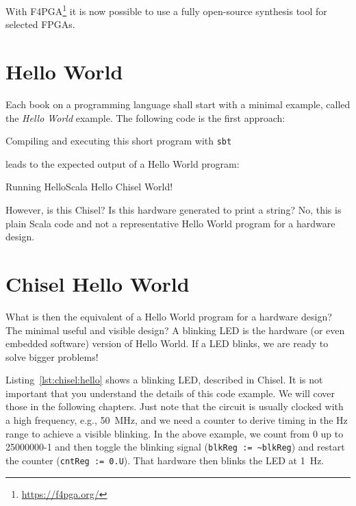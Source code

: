 \documentclass[%
    10pt,
    headinclude, footexclude,
    openright, %
    notitlepage,
    cleardoubleempty,
    headsepline,
    pointlessnumbers,
    bibtotoc, idxtotoc,
    ]{scrbook}
\newcommand{\code}[1]{{\lstinline[basicstyle=\small\ttfamily]{#1}}}
\newcommand{\myref}[2]{\href{#1}{#2}}
\renewcommand{\myref}[2]{{#2}{\footnote{\url{#1}}}}
\begin{document}
With \myref{https://f4pga.org/}{F4PGA} it is now possible to use a fully open-source synthesis tool
for selected FPGAs.

\section{Hello World}

Each book on a programming language shall start with a minimal example,
called the \emph{Hello World} example. The following code is the first approach:




\noindent Compiling and executing this short program with \code{sbt}


\noindent leads to the expected output of a Hello World program:

\begin{chisel}
[info] Running HelloScala
Hello Chisel World!
\end{chisel}

\noindent However, is this Chisel? Is this hardware generated to print a string?
No, this is plain Scala code and not a representative Hello World
program for a hardware design.

\section{Chisel Hello World}

What is then the equivalent of a Hello World program for a hardware design?
The minimal useful and visible design? A blinking LED is the hardware (or even
embedded software) version of Hello World. If a LED blinks, we are ready to
solve bigger problems!


Listing~\ref{lst:chisel:hello} shows a blinking LED, described in Chisel.
It is not important that you understand the details of this code example.
We will cover those in the following chapters. Just note that the circuit is
usually clocked with a high frequency, e.g., 50~MHz, and we need a counter
to derive timing in the Hz range to achieve a visible blinking. In the above
example, we count from 0 up to 25000000-1 and then toggle the blinking signal
(\code{blkReg := ~blkReg}) and restart the counter (\code{cntReg := 0.U}).
That hardware then blinks the LED at 1~Hz.
\end{document}
